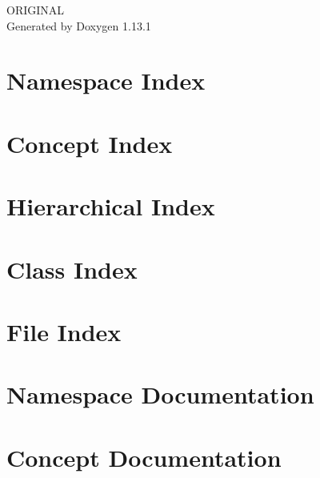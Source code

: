 \documentclass[twoside]{book}
\newcommand{\+}{\discretionary{\mbox{\scriptsize$\hookleftarrow$}}{}{}}
\newcommand{\clearemptydoublepage}{%
    \newpage{\pagestyle{empty}\cleardoublepage}%
  }
\begin{document}
  \raggedbottom
    \hypersetup{pageanchor=false,
                bookmarksnumbered=true,
                pdfencoding=unicode
               }
  \begin{titlepage}
  \vspace*{7cm}
  \begin{center}%
  {\Large ORIGINAL}\\
  \vspace*{1cm}
  {\large Generated by Doxygen 1.13.1}\\
  \end{center}
  \end{titlepage}
  \clearemptydoublepage
  \tableofcontents
  \clearemptydoublepage
  \hypersetup{pageanchor=true}

\chapter{Namespace Index}

\chapter{Concept Index}

\chapter{Hierarchical Index}

\chapter{Class Index}

\chapter{File Index}

\chapter{Namespace Documentation}

\chapter{Concept Documentation}









\end{document}
